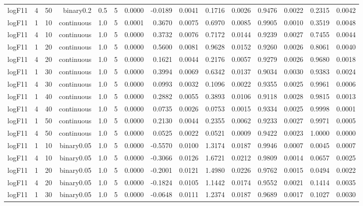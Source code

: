 \begin{longtable}{rrrrrrrrrrrrrrr}
  logF11 & 4 & 50 & binary0.2 & 0.5 & 5 & 0.0000 & -0.0189 & 0.0041 & 0.1716 & 0.0026 & 0.9476 & 0.0022 & 0.2315 & 0.0042 \\ 
  logF11 & 1 & 10 & continuous & 1.0 & 5 & 0.0001 & 0.3670 & 0.0075 & 0.6970 & 0.0085 & 0.9905 & 0.0010 & 0.3519 & 0.0048 \\ 
  logF11 & 4 & 10 & continuous & 1.0 & 5 & 0.0000 & 0.3732 & 0.0076 & 0.7172 & 0.0144 & 0.9239 & 0.0027 & 0.7455 & 0.0044 \\ 
  logF11 & 1 & 20 & continuous & 1.0 & 5 & 0.0000 & 0.5600 & 0.0081 & 0.9628 & 0.0152 & 0.9260 & 0.0026 & 0.8061 & 0.0040 \\ 
  logF11 & 4 & 20 & continuous & 1.0 & 5 & 0.0000 & 0.1621 & 0.0044 & 0.2176 & 0.0057 & 0.9279 & 0.0026 & 0.9680 & 0.0018 \\ 
  logF11 & 1 & 30 & continuous & 1.0 & 5 & 0.0000 & 0.3994 & 0.0069 & 0.6342 & 0.0137 & 0.9034 & 0.0030 & 0.9383 & 0.0024 \\ 
  logF11 & 4 & 30 & continuous & 1.0 & 5 & 0.0000 & 0.0993 & 0.0032 & 0.1096 & 0.0022 & 0.9355 & 0.0025 & 0.9961 & 0.0006 \\ 
  logF11 & 1 & 40 & continuous & 1.0 & 5 & 0.0000 & 0.2882 & 0.0055 & 0.3893 & 0.0106 & 0.9118 & 0.0028 & 0.9815 & 0.0013 \\ 
  logF11 & 4 & 40 & continuous & 1.0 & 5 & 0.0000 & 0.0735 & 0.0026 & 0.0753 & 0.0015 & 0.9334 & 0.0025 & 0.9998 & 0.0001 \\ 
  logF11 & 1 & 50 & continuous & 1.0 & 5 & 0.0000 & 0.2130 & 0.0044 & 0.2355 & 0.0062 & 0.9233 & 0.0027 & 0.9971 & 0.0005 \\ 
  logF11 & 4 & 50 & continuous & 1.0 & 5 & 0.0000 & 0.0525 & 0.0022 & 0.0521 & 0.0009 & 0.9422 & 0.0023 & 1.0000 & 0.0000 \\ 
  logF11 & 1 & 10 & binary0.05 & 1.0 & 5 & 0.0000 & -0.5570 & 0.0100 & 1.3174 & 0.0187 & 0.9946 & 0.0007 & 0.0045 & 0.0007 \\ 
  logF11 & 4 & 10 & binary0.05 & 1.0 & 5 & 0.0000 & -0.3066 & 0.0126 & 1.6721 & 0.0212 & 0.9809 & 0.0014 & 0.0657 & 0.0025 \\ 
  logF11 & 1 & 20 & binary0.05 & 1.0 & 5 & 0.0000 & -0.2001 & 0.0121 & 1.4980 & 0.0226 & 0.9762 & 0.0015 & 0.0494 & 0.0022 \\ 
  logF11 & 4 & 20 & binary0.05 & 1.0 & 5 & 0.0000 & -0.1824 & 0.0105 & 1.1442 & 0.0174 & 0.9552 & 0.0021 & 0.1414 & 0.0035 \\ 
  logF11 & 1 & 30 & binary0.05 & 1.0 & 5 & 0.0000 & -0.0648 & 0.0111 & 1.2374 & 0.0187 & 0.9689 & 0.0017 & 0.1027 & 0.0030 \\ 

\end{longtable}
